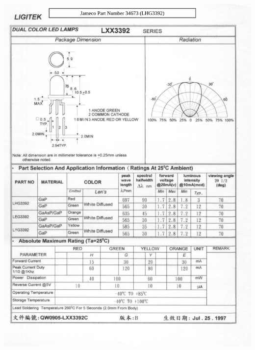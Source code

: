\documentclass[12pt]{article}
\begin{document}
\includegraphics[width=\textwidth]{../Appendix/Figures/Main-Unit/LED Datasheet2.png}
\end{document}
